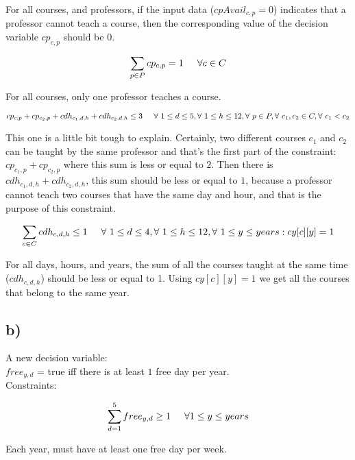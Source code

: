 \documentclass[11pt, oneside]{article}   	%
\begin{document}
For all courses, and professors, if the input data ($cpAvail_{c,p} = 0$) indicates that a professor cannot teach a course, then the corresponding value of the decision variable $cp_{c,p}$ should be $0$.

$$\sum_{p \in P} cp_{c,p} = 1 \hspace{5 mm} \forall c \in C$$

For all courses, only one professor teaches a course.

$$cp_{c,p} + cp_{c_2,p} + cdh_{c_1,d,h} + cdh_{c_2,d,h} \leq 3 \hspace{5 mm} \forall{}\ 1 \leq d \leq 5, \forall{}\ 1 \leq h \leq 12, \forall{}\ p \in P, \forall{}\ c_1,c_2 \in C, \forall{}\ c_1 < c_2 $$

This one is a little bit tough to explain. Certainly, two different courses $c_1$ and $c_2$ can be taught by the same professor and that's the first part of the constraint: $cp_{c_1,p} + cp_{c_2,p}$ where this sum is less or equal to $2$. Then there is $cdh_{c_1,d,h} + cdh_{c_2,d,h}$, this sum should be less or equal to $1$, because a professor cannot teach two courses that have the same day and hour, and that is the purpose of this constraint.

$$\sum_{c \in C} cdh_{c,d,h} \leq 1 \hspace{5 mm} \forall{}\ 1 \leq d \leq 4, \forall{}\ 1\leq h \leq 12, \forall{}\ 1 \leq y \leq years : cy[c][y] = 1$$

For all days, hours, and years, the sum of all the courses taught at the same time ($cdh_{c,d,h}$) should be less or equal to 1. Using $cy[c][y] = 1$ we get all the courses that belong to the same year.

\subsection{b)}

\hspace{\parindent}A new decision variable:\\

$free_{y,d}$ = true iff there is at least $1$ free day per year.\\

Constraints:

$$\sum_{d = 1}^{5} free_{y,d} \geq 1 \hspace{5 mm} \forall 1 \leq y \leq years$$

Each year, must have at least one free day per week.\\
\end{document}
